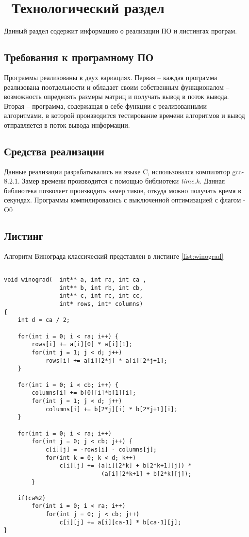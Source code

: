 \chapter{ Технологический раздел}
\label{cha:impl}

Данный раздел содержит информацию о реализации ПО и листингах програм.

\section{ Требования к програмному ПО}
Программы реализованы в двух вариациях. Первая -- каждая программа реализована поотдельности и обладает своим собственным функционалом -- возможность определять размеры матриц и получать вывод в поток вывода. Вторая -- программа, содержащая в себе функции с реализованными алгоритмами, в которой производится тестирование времени алгоритмов и вывод отправляется в поток вывода информации.

\section{ Средства реализации }
Данные реализации разрабатывались на языке C, использовался компилятор gcc-8.2.1.
Замер времени производится с помощью библиотеки \textit{time.h}. Данная библиотека позволяет производить замер тиков, откуда можно получать время в секундах. 
Программы компилировались с выключенной оптимизацией с флагом -O0

\section{ Листинг}
Алгоритм Винограда классический представлен в листинге \ref{list:winograd}
\begin{lstlisting}[style=CStyle, caption={Winograd algorithm},
                    label={list:winograd}]

void winograd(  int** a, int ra, int ca , 
                int** b, int rb, int cb, 
                int** c, int rc, int cc,
                int* rows, int* columns)
{
    int d = ca / 2;

    for(int i = 0; i < ra; i++) {
        rows[i] += a[i][0] * a[i][1];
        for(int j = 1; j < d; j++)
            rows[i] += a[i][2*j] * a[i][2*j+1];
    }

    for(int i = 0; i < cb; i++) {
        columns[i] += b[0][i]*b[1][i];
        for(int j = 1; j < d; j++)
            columns[i] += b[2*j][i] * b[2*j+1][i];
    }

    for(int i = 0; i < ra; i++)
        for(int j = 0; j < cb; j++) {
            c[i][j] = -rows[i] - columns[j];
            for(int k = 0; k < d; k++)
                c[i][j] += (a[i][2*k] + b[2*k+1][j]) * 
                            (a[i][2*k+1] + b[2*k][j]);
        }

    if(ca%2)
        for(int i = 0; i < ra; i++)
            for(int j = 0; j < cb; j++)
                c[i][j] += a[i][ca-1] * b[ca-1][j];
}
\end{lstlisting}

